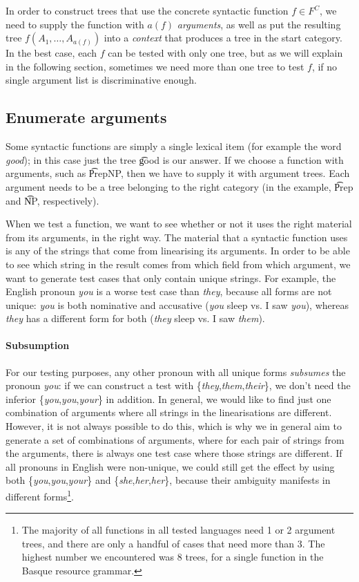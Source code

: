 In order to construct trees that use the concrete syntactic function
$f \in F^C$, we need to supply the function with
$a(f)$ \emph{arguments}, as well as put the resulting tree $f
(A_1,\ldots,A_{a(f)})$ into a \emph{context} that produces a tree in
the start category.  In the best case, each $f$ can be tested with
only one tree, but as we will explain in the following section,
sometimes we need more than one tree to test $f$, if no single
argument list is discriminative enough.


\subsection{Enumerate arguments} 
\label{enumerate-arguments}
Some syntactic functions are simply a single lexical item (for example
the word \emph{good}); in this case just the tree \t{good} is our
answer.  If we choose a function with arguments, such as \t{PrepNP},
then we have to supply it with argument trees. Each argument needs to
be a tree belonging to the right category (in the example, \t{Prep}
and \t{NP}, respectively).

When we test a function, we want to see whether or not it uses the
right material from its arguments, in the right way. The
material that a syntactic function uses is any of the strings that
come from linearising its arguments. In order to be able to see which
string in the result comes from which field from which argument, we
want to generate test cases that only contain unique strings.  For
example, the English pronoun {\em you} is a worse test case than {\em
  they}, because all forms are not unique: {\em you} is both
nominative and accusative ({\em you} sleep vs. I saw {\em you}),
whereas {\em they} has a different form for both ({\em they} sleep
vs. I saw {\em them}).


\paragraph{Subsumption} For our testing purposes, any other pronoun
with all unique forms \emph{subsumes} the pronoun {\em you}: if we can
construct a test with \{{\em they},{\em them},{\em their}\}, we don't
need the inferior \{{\em you},{\em you},{\em your}\} in addition. In
general, we would like to find just one combination of arguments where
all strings in the linearisations are different. However, it is not
always possible to do this, which is why we in general aim to generate
a set of combinations of arguments, where for each pair of strings
from the arguments, there is always one test case where those strings
are different. If all pronouns in English were non-unique, we could
still get the effect by using both \{{\em you},{\em you},{\em your}\}
and \{{\em she},{\em her},{\em her}\}, because their ambiguity
manifests in different forms\footnote{The majority of all functions in all tested languages need 1 or
2 argument trees, and there are only a handful of cases that need more
than 3. The highest number we encountered was 8 trees, for a single
function in the Basque resource grammar.}.

